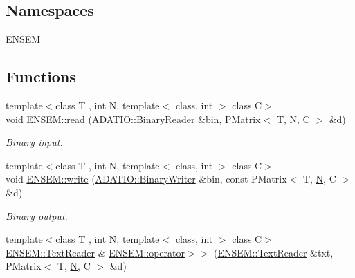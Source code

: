 \subsection*{Namespaces}
\begin{DoxyCompactItemize}
\item 
 \mbox{\hyperlink{namespaceENSEM}{E\+N\+S\+EM}}
\end{DoxyCompactItemize}
\subsection*{Functions}
\begin{DoxyCompactItemize}
\item 
{\footnotesize template$<$class T , int N, template$<$ class, int $>$ class C$>$ }\\void \mbox{\hyperlink{group__primmatrix_ga95daf5fb6c2f089f11774d123f8795d5}{E\+N\+S\+E\+M\+::read}} (\mbox{\hyperlink{classADATIO_1_1BinaryReader}{A\+D\+A\+T\+I\+O\+::\+Binary\+Reader}} \&bin, P\+Matrix$<$ T, \mbox{\hyperlink{adat__devel_2lib_2hadron_2operator__name__util_8cc_a7722c8ecbb62d99aee7ce68b1752f337}{N}}, C $>$ \&d)
\begin{DoxyCompactList}\small\item\em Binary input. \end{DoxyCompactList}\item 
{\footnotesize template$<$class T , int N, template$<$ class, int $>$ class C$>$ }\\void \mbox{\hyperlink{group__primmatrix_ga7255316b449512a4081c99a02e485e4c}{E\+N\+S\+E\+M\+::write}} (\mbox{\hyperlink{classADATIO_1_1BinaryWriter}{A\+D\+A\+T\+I\+O\+::\+Binary\+Writer}} \&bin, const P\+Matrix$<$ T, \mbox{\hyperlink{adat__devel_2lib_2hadron_2operator__name__util_8cc_a7722c8ecbb62d99aee7ce68b1752f337}{N}}, C $>$ \&d)
\begin{DoxyCompactList}\small\item\em Binary output. \end{DoxyCompactList}\item 
{\footnotesize template$<$class T , int N, template$<$ class, int $>$ class C$>$ }\\\mbox{\hyperlink{classENSEM_1_1TextReader}{E\+N\+S\+E\+M\+::\+Text\+Reader}} \& \mbox{\hyperlink{group__primmatrix_ga94a915150324a06d2d330515358811f2}{E\+N\+S\+E\+M\+::operator$>$$>$}} (\mbox{\hyperlink{classENSEM_1_1TextReader}{E\+N\+S\+E\+M\+::\+Text\+Reader}} \&txt, P\+Matrix$<$ T, \mbox{\hyperlink{adat__devel_2lib_2hadron_2operator__name__util_8cc_a7722c8ecbb62d99aee7ce68b1752f337}{N}}, C $>$ \&d)

\end{DoxyCompactItemize}
